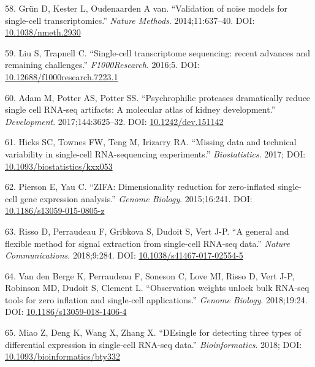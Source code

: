 \documentclass[11pt,a4paper,titlepage,twoside,openright]{style/unimelbthesis}
\theoremstyle{definition}
\theoremstyle{definition}
\theoremstyle{definition}
\theoremstyle{remark}
\begin{document}
\begin{mainmatter}
\leavevmode\hypertarget{ref-Grun2014-zn}{}%
58. Grün D, Kester L, Oudenaarden A van. ``Validation of noise models for single-cell transcriptomics.'' \emph{Nature Methods}. 2014;11:637--40. DOI: \href{https://doi.org/10.1038/nmeth.2930}{10.1038/nmeth.2930}

\leavevmode\hypertarget{ref-Liu2016-wq}{}%
59. Liu S, Trapnell C. ``Single-cell transcriptome sequencing: recent advances and remaining challenges.'' \emph{F1000Research}. 2016;5. DOI: \href{https://doi.org/10.12688/f1000research.7223.1}{10.12688/f1000research.7223.1}

\leavevmode\hypertarget{ref-Adam2017-zl}{}%
60. Adam M, Potter AS, Potter SS. ``Psychrophilic proteases dramatically reduce single cell RNA-seq artifacts: A molecular atlas of kidney development.'' \emph{Development}. 2017;144:3625--32. DOI: \href{https://doi.org/10.1242/dev.151142}{10.1242/dev.151142}

\leavevmode\hypertarget{ref-Hicks2017-ut}{}%
61. Hicks SC, Townes FW, Teng M, Irizarry RA. ``Missing data and technical variability in single-cell RNA-sequencing experiments.'' \emph{Biostatistics}. 2017; DOI: \href{https://doi.org/10.1093/biostatistics/kxx053}{10.1093/biostatistics/kxx053}

\leavevmode\hypertarget{ref-Pierson2015-qp}{}%
62. Pierson E, Yau C. ``ZIFA: Dimensionality reduction for zero-inflated single-cell gene expression analysis.'' \emph{Genome Biology}. 2015;16:241. DOI: \href{https://doi.org/10.1186/s13059-015-0805-z}{10.1186/s13059-015-0805-z}

\leavevmode\hypertarget{ref-Risso2018-dg}{}%
63. Risso D, Perraudeau F, Gribkova S, Dudoit S, Vert J-P. ``A general and flexible method for signal extraction from single-cell RNA-seq data.'' \emph{Nature Communications}. 2018;9:284. DOI: \href{https://doi.org/10.1038/s41467-017-02554-5}{10.1038/s41467-017-02554-5}

\leavevmode\hypertarget{ref-Van_den_Berge2018-ip}{}%
64. Van den Berge K, Perraudeau F, Soneson C, Love MI, Risso D, Vert J-P, Robinson MD, Dudoit S, Clement L. ``Observation weights unlock bulk RNA-seq tools for zero inflation and single-cell applications.'' \emph{Genome Biology}. 2018;19:24. DOI: \href{https://doi.org/10.1186/s13059-018-1406-4}{10.1186/s13059-018-1406-4}

\leavevmode\hypertarget{ref-Miao2018-ft}{}%
65. Miao Z, Deng K, Wang X, Zhang X. ``DEsingle for detecting three types of differential expression in single-cell RNA-seq data.'' \emph{Bioinformatics}. 2018; DOI: \href{https://doi.org/10.1093/bioinformatics/bty332}{10.1093/bioinformatics/bty332}


\end{mainmatter}
\end{document}
